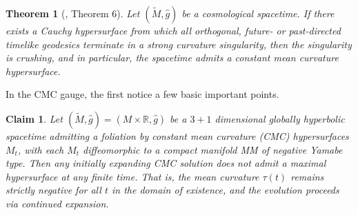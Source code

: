 \documentclass{amsart}
\newtheorem*{theorem-non}{Theorem}
\newtheorem{claim}{Claim}
\begin{document}
\begin{theorem-non}[\cite{marsden1980maximal}, Theorem 6]
Let $(\widetilde{M},\widehat{g})$ be a cosmological spacetime. If there exists a Cauchy hypersurface from which all orthogonal, future- or past-directed timelike geodesics terminate in a strong curvature singularity, then the singularity is crushing, and in particular, the spacetime admits a constant mean curvature hypersurface.
\end{theorem-non}
\noindent In the CMC gauge, the first notice a few basic important points. 
\begin{claim}
\label{important}
Let $(\widetilde{M},\widehat{g})=(M\times \mathbb{R},\widehat{g})$ be a $3+1$ dimensional globally hyperbolic spacetime admitting a foliation by constant mean curvature (CMC) hypersurfaces $M_{t}$, with each $M_{t}$ diffeomorphic to a compact manifold MM of negative Yamabe type. Then any initially expanding CMC solution does not admit a maximal hypersurface at any finite time. That is, the mean curvature $\tau(t)$ remains strictly negative for all $t$ in the domain of existence, and the evolution proceeds via continued expansion.
\end{claim}
\end{document}

